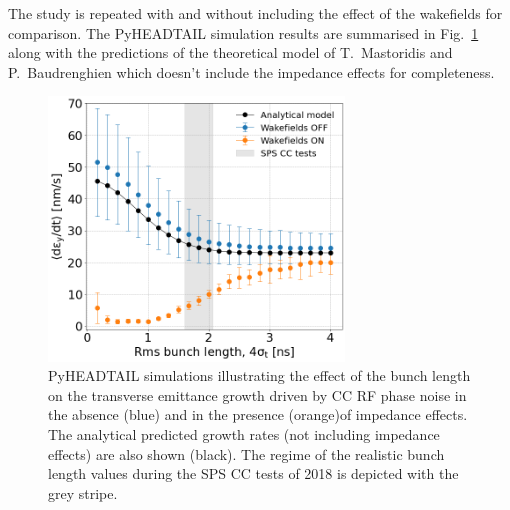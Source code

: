 The study is repeated with and without including the effect of the wakefields for comparison. The PyHEADTAIL simulation results are summarised in Fig.~\ref{fig:study_10_bunch_length} along with the predictions of the theoretical model of T.~Mastoridis and P.~Baudrenghien which doesn't include the impedance effects for completeness.

\begin{figure}[!h] %
    \centering         
    \includegraphics[width=0.7\textwidth]{images/Ch7/deyRates_sps_PN1e-8_00MHz_270GeV_wakesOFF_vs_ON_QpxQpy5e-1_Nb5e5_ayy2000_slices500_intensity3e10_sigmaScanScanZvsTheorywithoutWakes_vs_SPS_sigmaz_ignore_first_point.png}
        \caption{PyHEADTAIL simulations illustrating the effect of the bunch length on the transverse emittance growth driven by CC RF phase noise in the absence (blue) and in the presence (orange)of impedance effects. The analytical predicted growth rates (not including impedance effects) are also shown (black). The regime of the realistic bunch length values during the SPS CC tests of 2018 is depicted with the grey stripe.}
        \label{fig:study_10_bunch_length}
 \end{figure}

